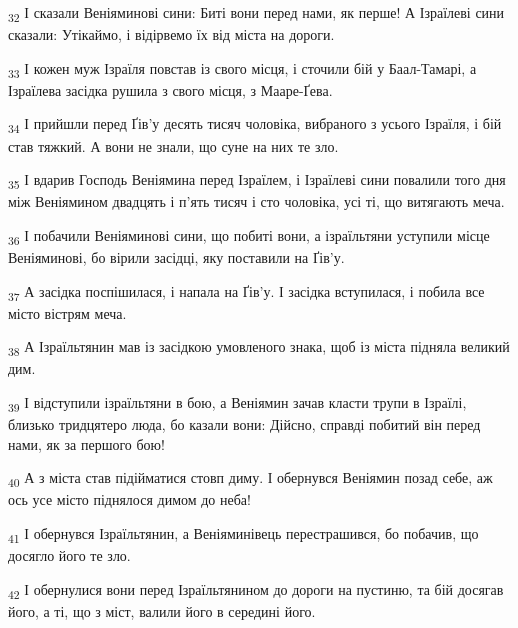 \begin{tcolorbox}
\textsubscript{32} І сказали Веніяминові сини: Биті вони перед нами, як перше! А Ізраїлеві сини сказали: Утікаймо, і відірвемо їх від міста на дороги.
\end{tcolorbox}
\begin{tcolorbox}
\textsubscript{33} І кожен муж Ізраїля повстав із свого місця, і сточили бій у Баал-Тамарі, а Ізраїлева засідка рушила з свого місця, з Мааре-Ґева.
\end{tcolorbox}
\begin{tcolorbox}
\textsubscript{34} І прийшли перед Ґів'у десять тисяч чоловіка, вибраного з усього Ізраїля, і бій став тяжкий. А вони не знали, що суне на них те зло.
\end{tcolorbox}
\begin{tcolorbox}
\textsubscript{35} І вдарив Господь Веніямина перед Ізраїлем, і Ізраїлеві сини повалили того дня між Веніямином двадцять і п'ять тисяч і сто чоловіка, усі ті, що витягають меча.
\end{tcolorbox}
\begin{tcolorbox}
\textsubscript{36} І побачили Веніяминові сини, що побиті вони, а ізраїльтяни уступили місце Веніяминові, бо вірили засідці, яку поставили на Ґів'у.
\end{tcolorbox}
\begin{tcolorbox}
\textsubscript{37} А засідка поспішилася, і напала на Ґів'у. І засідка вступилася, і побила все місто вістрям меча.
\end{tcolorbox}
\begin{tcolorbox}
\textsubscript{38} А Ізраїльтянин мав із засідкою умовленого знака, щоб із міста підняла великий дим.
\end{tcolorbox}
\begin{tcolorbox}
\textsubscript{39} І відступили ізраїльтяни в бою, а Веніямин зачав класти трупи в Ізраїлі, близько тридцятеро люда, бо казали вони: Дійсно, справді побитий він перед нами, як за першого бою!
\end{tcolorbox}
\begin{tcolorbox}
\textsubscript{40} А з міста став підійматися стовп диму. І обернувся Веніямин позад себе, аж ось усе місто піднялося димом до неба!
\end{tcolorbox}
\begin{tcolorbox}
\textsubscript{41} І обернувся Ізраїльтянин, а Веніяминівець перестрашився, бо побачив, що досягло його те зло.
\end{tcolorbox}
\begin{tcolorbox}
\textsubscript{42} І обернулися вони перед Ізраїльтянином до дороги на пустиню, та бій досягав його, а ті, що з міст, валили його в середині його.
\end{tcolorbox}
